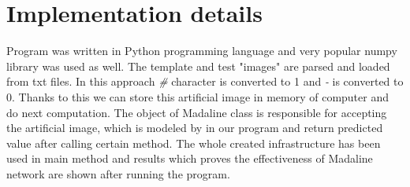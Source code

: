 \documentclass{classrep}
\begin{document}
    \section{Implementation details}
    \label{implementation} {
        Program was written in Python programming language and very popular numpy
        library was used as well. The template and test "images" are parsed and loaded
        from txt files. In this approach \textit{#} character is converted to 1 and
        \textit{-} is converted to 0. Thanks to this we can store this artificial image in
        memory of computer and do next computation. The object of Madaline class is
        responsible for accepting the artificial image, which is modeled by in our
        program and return predicted value after calling certain method. The whole
        created infrastructure has been used in main method and results which proves the
        effectiveness of Madaline network are shown after running the program.
    }
\end{document}
